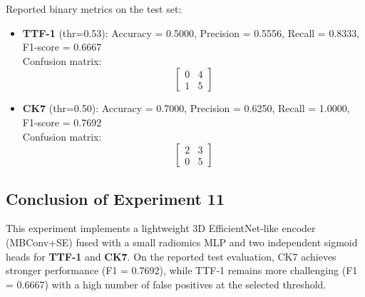 Reported binary metrics on the test set:
\begin{itemize}
    \item \textbf{TTF-1} (thr=0.53): Accuracy = 0.5000, Precision = 0.5556, Recall = 0.8333, F1-score = 0.6667 \\
    Confusion matrix:
    \[
    \begin{bmatrix}
    0 & 4 \\
    1 & 5
    \end{bmatrix}
    \]
    \item \textbf{CK7} (thr=0.50): Accuracy = 0.7000, Precision = 0.6250, Recall = 1.0000, F1-score = 0.7692 \\
    Confusion matrix:
    \[
    \begin{bmatrix}
    2 & 3 \\
    0 & 5
    \end{bmatrix}
    \]
\end{itemize}

\subsection{Conclusion of Experiment 11}
This experiment implements a lightweight 3D EfficientNet-like encoder (MBConv+SE) fused with a small radiomics MLP and two independent sigmoid heads for \textbf{TTF-1} and \textbf{CK7}. On the reported test evaluation, CK7 achieves stronger performance (F1 = 0.7692), while TTF-1 remains more challenging (F1 = 0.6667) with a high number of false positives at the selected threshold.
